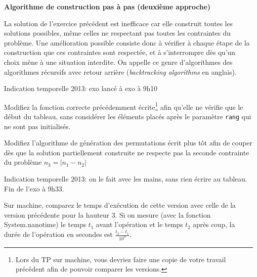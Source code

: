 \documentclass[10pt]{article}\usepackage[correction,nu]{esial}
\begin{document}
\begin{Exercice}\textbf{Algorithme de construction pas à pas (deuxième approche)}

  \noindent La solution de l'exercice précédent est inefficace car elle
  construit toutes les solutions possibles, même celles ne respectant pas toutes
  les contraintes du problème. Une amélioration possible consiste donc à
  vérifier à chaque étape de la construction que ces contraintes sont respectée,
  et à s'interrompre dès qu'un choix mène à une situation interdite.
  On appelle ce genre d'algorithmes des algorithmes récursifs avec retour
  arrière (\textit{backtracking algorithms} en anglais).

  \begin{Reponse}
      Indication temporelle 2013: exo lancé à exo à 9h10
  \end{Reponse}

  \begin{Question}
    Modifiez la fonction correcte précédemment écrite\footnote{Lors du TP sur
      machine, vous devriez faire une copie de votre travail précédent afin de
      pouvoir comparer les versions.} afin qu'elle ne vérifie
    que le début du tableau, sans considérer les éléments placés après le
    paramètre \texttt{rang} qui ne sont pas initialisés.
  \end{Question}

  \begin{Reponse}
    \newcommand*\FancyVerbStartString{// BEGIN CORRECTE}
    \newcommand*\FancyVerbStopString{// END CORRECTE}
  \end{Reponse}

  \Question %
  Modifiez l'algorithme de génération des permutations écrit plus tôt afin de
  couper dès que la solution partiellement construite ne respecte pas la seconde
  contrainte du problème $n_3=\left|n_1-n_2\right|$

  \begin{Reponse}
    \newcommand*\FancyVerbStartString{// BEGIN GENERE}
    \newcommand*\FancyVerbStopString{// END GENERE}

    Indication temporelle 2013: on le fait avec les mains, sans rien écrire au
    tableau. Fin de l'exo à 9h33.
  \end{Reponse}

  \Question %
  Sur machine, comparez le temps d'exécution de cette version avec celle de la
  version précédente pour la hauteur 3.  Si on mesure (avec la fonction
  System.nanotime) le temps $t_1$ avant l'opération et le temps $t_2$ après
  coup, la durée de l'opération en secondes est $\frac{t_2-t_1}{10^9}$.
\end{Exercice}
\end{document}
